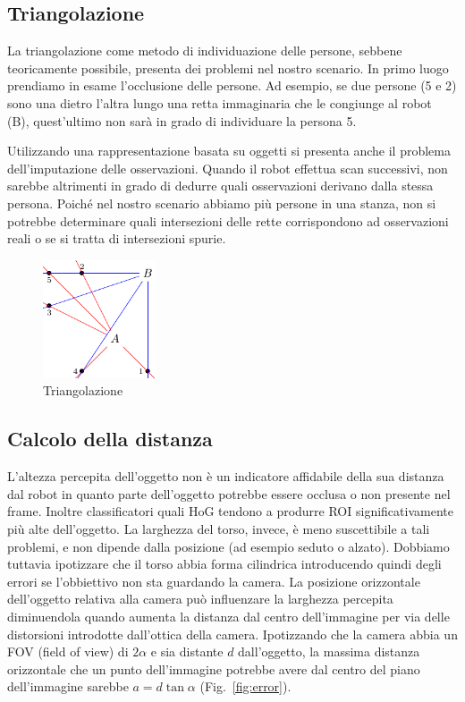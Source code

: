 \documentclass[a4paper]{article}
\begin{document}
	\newpage
	\subsection{Triangolazione}\label{subsec:Triangolazione}
	La triangolazione come metodo di individuazione delle persone, sebbene
	teoricamente possibile, presenta dei problemi nel nostro scenario. In primo
	luogo prendiamo in esame l'occlusione delle persone. Ad esempio, se due
	persone (5 e 2) sono una dietro l'altra lungo una retta immaginaria che le
	congiunge al robot (B), quest'ultimo non sarà in grado di individuare la
	persona 5. 
	
	Utilizzando una rappresentazione basata su oggetti si presenta anche il
	problema dell'imputazione delle osservazioni. Quando il robot effettua scan
	successivi, non sarebbe altrimenti in grado di dedurre quali osservazioni
	derivano dalla stessa persona.  Poiché nel nostro scenario abbiamo più
	persone in una stanza, non si potrebbe determinare quali intersezioni delle
	rette corrispondono ad osservazioni reali o se si tratta di intersezioni
	spurie. 
	
	\begin{figure}[H]
		\centering
		\includegraphics[width=0.3\textwidth]{./img/ideal_object_triangulation.pdf}
		\caption{Triangolazione}
		\label{fig:triangulation}
	\end{figure}
	
	\subsection{Calcolo della distanza}\label{subsec:Calcolo-della-distanza}
	L'altezza percepita dell'oggetto non è un indicatore affidabile della sua
	distanza dal robot in quanto parte dell'oggetto potrebbe essere occlusa o
	non presente nel frame. Inoltre classificatori quali HoG tendono a produrre
	ROI significativamente più alte dell'oggetto. La larghezza del torso,
	invece, è meno suscettibile a tali problemi, e non dipende dalla posizione
	(ad esempio seduto o alzato). Dobbiamo tuttavia ipotizzare che il torso
	abbia forma cilindrica introducendo quindi degli errori se l'obbiettivo non
	sta guardando la camera.	La posizione orizzontale dell'oggetto relativa
	alla camera può influenzare la larghezza percepita diminuendola quando
	aumenta la distanza dal centro dell'immagine per via delle distorsioni
	introdotte dall'ottica della camera. Ipotizzando che la camera abbia un FOV
	(field of view) di $2\alpha$ e sia distante $d$ dall'oggetto, la massima
	distanza orizzontale che un punto dell'immagine potrebbe avere dal centro
	del piano dell'immagine sarebbe $a = d \tan \alpha$ (Fig.~\ref{fig:error}).
	
\end{document}

